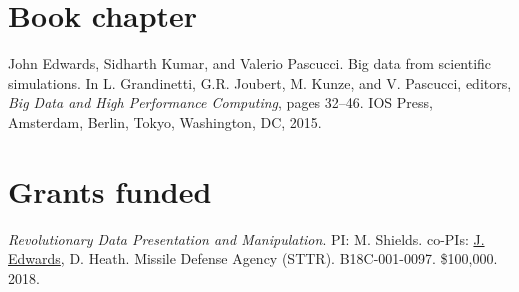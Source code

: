 \documentclass[margin,line]{res}
\begin{document}
\begin{resume}
\section{\sc Book chapter}

John Edwards, Sidharth Kumar, and Valerio Pascucci. Big data from scientific simulations. In L. Grandinetti, G.R. Joubert, M. Kunze, and V. Pascucci, editors, \textit{Big Data and High Performance Computing}, pages 32--46. IOS Press, Amsterdam, Berlin, Tokyo, Washington, DC, 2015.

%




\section{\sc Grants funded}
\textit{Revolutionary Data Presentation and Manipulation}. PI: M. Shields. co-PIs: \underline{J. Edwards}, D. Heath. Missile Defense Agency (STTR). B18C-001-0097. \$100,000. 2018.


\end{resume}
\end{document}
